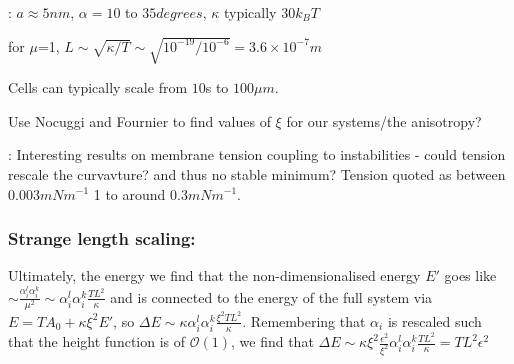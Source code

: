 {\cite{galatola_many-body_2023}: $a\approx5nm$, $\alpha=10$ to $35 degrees$, $\kappa$ typically $30 k_B T$

for $\mu$=1,  $L \sim \sqrt{\kappa/T} \sim \sqrt{10^{-19}/10^{-6}}=3.6\times10^{-7}m$

Cells can typically scale from $10$s to $100\mu m$.

Use Nocuggi and Fournier to find values of $\xi$ for our systems/the anisotropy?

\cite{shi_membrane_2015}: Interesting results on membrane tension coupling to instabilities - could tension rescale the curvavture? and thus no stable minimum? 
Tension quoted as between $0.003mNm^{-1}$ 1 to around $0.3mNm^{-1}$.

\subsubsection{Strange length scaling:}

Ultimately, the energy we find that the non-dimensionalised energy  $E'$ goes like $\sim \frac{\alpha_{i}^{l}\alpha_{i}^{k}}{\mu^2} \sim \alpha_{i}^{l}\alpha_{i}^{k}\frac{TL^2}{\kappa}$ and is connected to the energy of the full system via $E= TA_0 + \kappa\xi^2 E'$, so $\Delta E \sim \kappa \alpha_{i}^{l}\alpha_{i}^{k}\frac{\xi^2TL^2}{\kappa}$. Remembering that $\alpha_i$ is rescaled such that the height function is of $\mathcal{O}(1)$, we find that $\Delta E \sim \kappa\xi^2\frac{\epsilon^2}{\xi^2}\alpha_{i}^{l}\alpha_{i}^{k}\frac{TL^2}{\kappa} = TL^2\epsilon^2$
}
